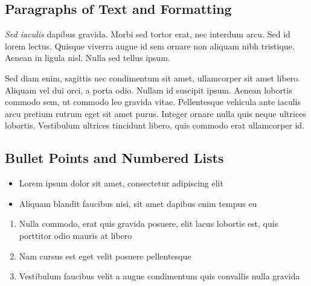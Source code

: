\documentclass[
paper=128mm:96mm, %
fontsize=11pt, %
pagesize, %
parskip=half-, %
]{scrartcl} %
\newcommand*{\mygreen}[1]{\textcolor{mygreen}{#1}}
\newcommand*{\myblue}[1]{\textcolor{myblue}{#1}}
\newcommand*{\mybrown}[1]{\textcolor{mybrown}{#1}}
\newcommand*{\myred}[1]{\textcolor{myred}{#1}}
\theoremstyle{mythmstyle} %
\begin{document}
\clearpage


\subsection{Paragraphs of Text and Formatting}

\textit{Sed iaculis} dapibus gravida. Morbi sed tortor erat, nec interdum arcu. Sed id lorem lectus. Quisque viverra augue id sem ornare non aliquam nibh tristique. Aenean in ligula nisl. Nulla sed tellus ipsum.

\begin{multicols}{2} %
  \mygreen{Sed diam enim, sagittis nec} condimentum sit amet, ullamcorper sit amet libero. \mybrown{Aliquam vel dui orci}, a porta odio. \myred{Nullam id suscipit} ipsum. \myblue{Aenean lobortis} commodo sem, ut commodo leo gravida vitae. Pellentesque vehicula ante iaculis arcu pretium rutrum eget sit amet purus. Integer ornare nulla quis neque ultrices lobortis. Vestibulum ultrices tincidunt libero, quis commodo erat ullamcorper id.
\end{multicols}

\clearpage


\subsection{Bullet Points and Numbered Lists}

\begin{itemize}
\item Lorem ipsum dolor sit amet, consectetur adipiscing elit
\item Aliquam blandit faucibus nisi, sit amet dapibus enim tempus eu
\end{itemize}

\begin{enumerate}
\item Nulla commodo, erat quis gravida posuere, elit lacus lobortis est, quis porttitor odio mauris at libero
\item Nam cursus est eget velit posuere pellentesque
\item Vestibulum faucibus velit a augue condimentum quis convallis nulla gravida
\end{enumerate}

\clearpage
\end{document}

